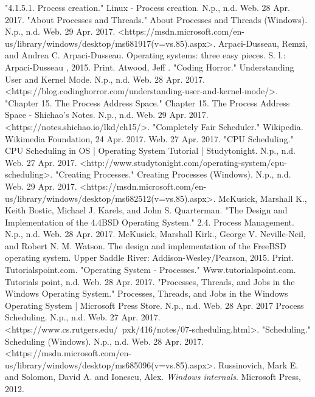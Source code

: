\documentclass[onecolumn, draftclsnofoot,10pt, compsoc]{IEEEtran}
\begin{document}
\begin{thebibliography}{7}
 "4.1.5.1. Process creation." Linux - Process creation. N.p., n.d. Web. 28 Apr. 2017.
 "About Processes and Threads." About Processes and Threads (Windows). N.p., n.d. Web. 29 Apr.
2017. <https://msdn.microsoft.com/en-us/library/windows/desktop/ms681917(v=vs.85).aspx>.
 Arpaci-Dusseau, Remzi, and Andrea C. Arpaci-Dusseau. Operating systems: three easy pieces. S. l.: Arpaci-Dusseau , 2015. Print.
 Atwood, Jeff . "Coding Horror." Understanding User and Kernel Mode. N.p., n.d. Web. 28 Apr. 2017. <https://blog.codinghorror.com/understanding-user-and-kernel-mode/>.
 "Chapter 15. The Process Address Space." Chapter 15. The Process Address Space - Shichao's Notes. N.p., n.d. Web. 29 Apr. 2017. <https://notes.shichao.io/lkd/ch15/>.
 "Completely Fair Scheduler." Wikipedia. Wikimedia Foundation, 24 Apr. 2017. Web. 27 Apr. 2017.
 "CPU Scheduling." CPU Scheduling in OS | Operating System Tutorial | Studytonight. N.p., n.d. Web. 27 Apr. 2017. <http://www.studytonight.com/operating-system/cpu-scheduling>.
 "Creating Processes." Creating Processes (Windows). N.p., n.d. Web. 29 Apr. 2017. <https://msdn.microsoft.com/en-us/library/windows/desktop/ms682512(v=vs.85).aspx>.
 McKusick, Marshall K., Keith Bostic, Michael J. Karels, and John S. Quarterman. "The Design and Implementation of the 4.4BSD Operating System." 2.4. Process Management. N.p., n.d. Web. 28 Apr. 2017.
    McKusick, Marshall Kirk., George V. Neville-Neil, and Robert N. M. Watson. The design and implementation of the FreeBSD operating system. Upper Saddle River: Addison-Wesley/Pearson, 2015. Print.
    Tutorialspoint.com. "Operating System - Processes." Www.tutorialspoint.com. Tutorials point, n.d. Web. 28 Apr. 2017.
    "Processes, Threads, and Jobs in the Windows Operating System." Processes, Threads, and Jobs in the Windows Operating System | Microsoft Press Store. N.p., n.d. Web. 28 Apr. 2017
    Process Scheduling. N.p., n.d. Web. 27 Apr. 2017. <https://www.cs.rutgers.edu/~pxk/416/notes/07-scheduling.html>.
    "Scheduling." Scheduling (Windows). N.p., n.d. Web. 28 Apr. 2017. <https://msdn.microsoft.com/en-us/library/windows/desktop/ms685096(v=vs.85).aspx>.
Russinovich, Mark E. and Solomon, David A. and Ionescu, Alex.
\textit{Windows internals}. 
Microsoft Press, 2012.

\end{thebibliography}
\end{document}
